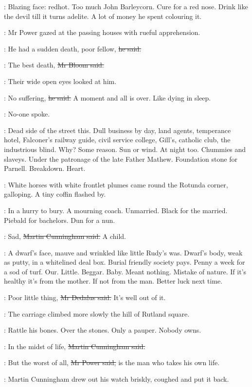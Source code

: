 \BloomInt:
Blazing face:
redhot.
Too much John Barleycorn.
Cure for a red nose.
Drink like the devil till it turns adelite.
A lot of money he spent colouring it.

:
Mr Power gazed at the passing houses
with rueful apprehension.

\power:
He had a sudden death, poor fellow,
\sout{he said.}

\Bloom:
The best death,
\sout{Mr Bloom said.}

:
Their wide open eyes looked at him.

\Bloom:
No suffering,
\sout{he said.}
A moment and all is over.
Like dying in sleep.

:
No-one spoke.

\BloomInt:
Dead side of the street this.
Dull business by day,
land agents, temperance hotel,
Falconer's railway guide, civil service college,
Gill's, catholic club, the industrious blind.
Why?
Some reason.
Sun or wind.
At night too.
Chummies and slaveys.
Under the patronage of the late Father Mathew.
Foundation stone for Parnell.
Breakdown.
Heart.

:
White horses with white frontlet plumes came round the Rotunda corner,
galloping.
A tiny coffin flashed by.

\BloomInt:
In a hurry to bury.
A mourning coach.
Unmarried.
Black for the married.
Piebald for bachelors.
Dun for a nun.

\cunningham:
Sad,
\sout{Martin Cunningham said.}
A child.

\BloomInt:
A dwarf's face, mauve and wrinkled like little Rudy's was.
Dwarf's body, weak as putty, in a whitelined deal box.
Burial friendly society pays.
Penny a week for a sod of turf.
Our.
Little.
Beggar.
Baby.
Meant nothing.
Mistake of nature.
If it's healthy it's from the mother.
If not from the man.
Better luck
next time.

\simon:
Poor little thing,
\sout{Mr Dedalus said.}
It's well out of it.

:
The carriage climbed more slowly the hill of Rutland square.

\BloomInt:
Rattle his bones.
Over the stones.
Only a pauper.
Nobody owns.

\cunningham:
In the midst of life,
\sout{Martin Cunningham said.}

\power:
But the worst of all,
\sout{Mr Power said,}
is the man who takes his own life.

:
Martin Cunningham drew out his watch briskly,
coughed and put it back.

